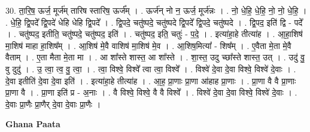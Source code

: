 \documentclass[17pt]{extarticle}
\begin{document}
30. ता॒रि॒ष॒ ऊर्ज॒ मूर्ज॑म् तारिष स्तारिष॒ ऊर्ज᳚म् । . ऊर्ज॑न् नो न॒ ऊर्ज॒ मूर्ज॑न्नः । . नो॒ धे॒हि॒ धे॒हि॒ नो॒ नो॒ धे॒हि॒ । . धे॒हि॒ द्वि॒पदे᳚ द्वि॒पदे॑ धेहि धेहि द्वि॒पदे᳚ । . द्वि॒पदे॒ चतु॑ष्पदे॒ चतु॑ष्पदे द्वि॒पदे᳚ द्वि॒पदे॒ चतु॑ष्पदे । . द्वि॒पद॒ इति॑ द्वि - पदे᳚ । . चतु॑ष्पद॒ इतीति॒ चतु॑ष्पदे॒ चतु॑ष्पद॒ इति॑ । . चतु॑ष्पद॒ इति॒ चतुः॑ - प॒दे॒ । . इत्या॑हा॒हे तीत्या॑ह । . आ॒हा॒शिष॑ मा॒शिष॑ माहा हा॒शिष᳚म् । . आ॒शिष॑ मे॒वै वाशिष॑ मा॒शिष॑ मे॒व । . आ॒शिष॒मित्या᳚ - शिष᳚म् । . ए॒वैता मे॒ता मे॒वै वैताम् । . ए॒ता मैता मे॒ता मा । . आ शा᳚स्ते शास्त॒ आ शा᳚स्ते । . शा॒स्त॒ उदु च्छा᳚स्ते शास्त॒ उत् । . उदु॑ वु॒ वु दुदु॑ । . उ॒ त्वा॒ त्व॒ वु॒ त्वा॒ । . त्वा॒ विश्वे॒ विश्वे᳚ त्वा त्वा॒ विश्वे᳚ । . विश्वे॑ दे॒वा दे॒वा विश्वे॒ विश्वे॑ दे॒वाः । . दे॒वा इतीति॑ दे॒वा दे॒वा इति॑ । . इत्या॑हा॒हे तीत्या॑ह । . आ॒ह॒ प्रा॒णाः प्रा॒णा आ॑हाह प्रा॒णाः । . प्रा॒णा वै वै प्रा॒णाः प्रा॒णा वै । . प्रा॒णा इति॑ प्र - अ॒नाः । . वै विश्वे॒ विश्वे॒ वै वै विश्वे᳚ । . विश्वे॑ दे॒वा दे॒वा विश्वे॒ विश्वे॑ दे॒वाः । . दे॒वाः प्रा॒णैः प्रा॒णैर् दे॒वा दे॒वाः प्रा॒णैः । \newline

\textbf{Ghana Paata } \newline
\end{document}
